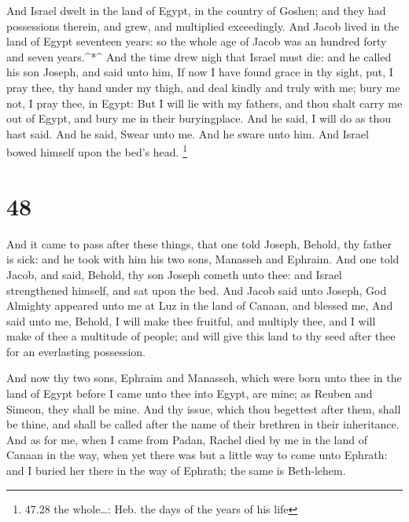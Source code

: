  And Israel dwelt in the land of Egypt, in the country of
Goshen; and they had possessions therein, and grew, and multiplied
exceedingly.  And Jacob lived in the land of Egypt
seventeen years: so the whole age of Jacob was an hundred forty and
seven years.\^{}*\^{}  And the time drew nigh that Israel
must die: and he called his son Joseph, and said unto him, If now I have
found grace in thy sight, put, I pray thee, thy hand under my thigh, and
deal kindly and truly with me; bury me not, I pray thee, in Egypt:
 But I will lie with my fathers, and thou shalt carry me
out of Egypt, and bury me in their buryingplace. And he said, I will do
as thou hast said.  And he said, Swear unto me. And he
sware unto him. And Israel bowed himself upon the bed's head.
\footnote{47.28 the whole\ldots: Heb. the days of the years of his life}

\hypertarget{section-47}{%
\section{48}\label{section-47}}

 And it came to pass after these things, that one told
Joseph, Behold, thy father is sick: and he took with him his two sons,
Manasseh and Ephraim.  And one told Jacob, and said, Behold,
thy son Joseph cometh unto thee: and Israel strengthened himself, and
sat upon the bed.  And Jacob said unto Joseph, God Almighty
appeared unto me at Luz in the land of Canaan, and blessed me,
 And said unto me, Behold, I will make thee fruitful, and
multiply thee, and I will make of thee a multitude of people; and will
give this land to thy seed after thee for an everlasting possession.

 And now thy two sons, Ephraim and Manasseh, which were born
unto thee in the land of Egypt before I came unto thee into Egypt, are
mine; as Reuben and Simeon, they shall be mine.  And thy
issue, which thou begettest after them, shall be thine, and shall be
called after the name of their brethren in their inheritance.
 And as for me, when I came from Padan, Rachel died by me in
the land of Canaan in the way, when yet there was but a little way to
come unto Ephrath: and I buried her there in the way of Ephrath; the
same is Beth-lehem.

